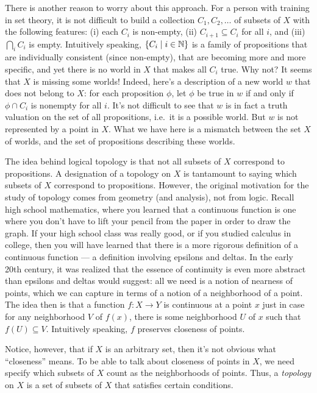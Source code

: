 There is another reason to worry about this approach.  For a person
with training in set theory, it is not difficult to build a collection
$C_1,C_2,\dots $ of subsets of $X$ with the following features: (i)
each $C_i$ is non-empty, (ii) $C_{i+1}\subseteq C_i$ for all $i$, and
(iii) $\bigcap _iC_i$ is empty.  Intuitively speaking, $\{ C_i\mid
i\in \mathbb N \}$ is a family of propositions that are individually
consistent (since non-empty), that are becoming more and more
specific, and yet there is no world in $X$ that makes all $C_i$ true.
Why not?  It seems that $X$ is missing some worlds!  Indeed, here's a
description of a new world $w$ that does not belong to $X$: for each
proposition $\phi$, let $\phi$ be true in $w$ if and only if $\phi\cap
C_i$ is nonempty for all $i$.  It's not difficult to see that $w$ is
in fact a truth valuation on the set of all propositions, i.e.\ it is
a possible world.  But $w$ is not represented by a point in $X$.  What
we have here is a mismatch between the set $X$ of worlds, and the set
of propositions describing these worlds.

The idea behind logical topology is that not all subsets of $X$
correspond to propositions.  A designation of a topology on $X$ is
tantamount to saying which subsets of $X$ correspond to propositions.
However, the original motivation for the study of topology comes from
geometry (and analysis), not from logic.  Recall high school
mathematics, where you learned that a continuous function is one where
you don't have to lift your pencil from the paper in order to draw the
graph.  If your high school class was really good, or if you studied
calculus in college, then you will have learned that there is a more
rigorous definition of a continuous function --- a definition
involving epsilons and deltas.  In the early 20th century, it was
realized that the essence of continuity is even more abstract than
epsilons and deltas would suggest: all we need is a notion of nearness
of points, which we can capture in terms of a notion of a neighborhood
of a point.  The idea then is that a function $f:X\to Y$ is continuous
at a point $x$ just in case for any neighborhood $V$ of $f(x)$, there
is some neighborhood $U$ of $x$ such that $f(U)\subseteq V$.
Intuitively speaking, $f$ preserves closeness of points.

Notice, however, that if $X$ is an arbitrary set, then it's not
obvious what ``closeness'' means.  To be able to talk about closeness
of points in $X$, we need specify which subsets of $X$ count as the
neighborhoods of points.  Thus, a \emph{topology} on $X$ is a set of
subsets of $X$ that satisfies certain conditions.

